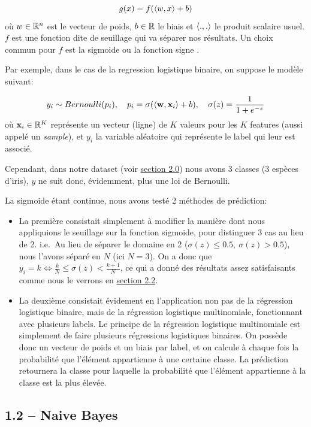 \documentclass[
]{article}
\providecommand{\tightlist}{%
  \setlength{\itemsep}{0pt}\setlength{\parskip}{0pt}}
\begin{document}
\[
g(x) = f(\langle w, x \rangle + b)
\] où \(w \in \mathbb{R}^n\) est le vecteur de poids, \(b \in \mathbb{R}\) le biais et
\(\langle ., . \rangle\) le produit scalaire usuel. \(f\) est une fonction
dite de seuillage qui va séparer nos résultats. Un choix commun pour
\(f\) est la sigmoide ou la fonction signe
\cite{ClassifieurLineaire2022}.

Par exemple, dans le cas de la regression logistique binaire, on suppose
le modèle suivant:

\[
y_i \sim Bernoulli(p_i),\quad p_i = \sigma(\langle \mathbf{w}, \mathbf{x}_i \rangle + b),\quad \sigma(z) = \frac{1}{1 + e^{-z}}
\] où \(\mathbf{x}_i \in \mathbb{R}^K\) représente un vecteur (ligne) de \(K\)
valeurs pour les \(K\) features (aussi appelé un \emph{sample}), et
\(y_i\) la variable aléatoire qui représente le label qui leur est
associé.

Cependant, dans notre dataset (voir
\href{#choix-du-dataset-outils-utilisuxe9s}{section 2.0}) nous avons 3
classes (3 espèces d'iris), \(y\) ne suit donc, évidemment, plus une loi
de Bernoulli.

La sigmoide étant continue, nous avons testé 2 méthodes de prédiction:

\begin{itemize}
\tightlist
\item
  La première consistait simplement à modifier la manière dont nous
  appliquions le seuillage sur la fonction sigmoide, pour distinguer 3
  cas au lieu de 2. i.e.~Au lieu de séparer le domaine en 2
  (\(\sigma(z) \leq 0.5,\ \sigma(z) > 0.5\)), nous l'avons séparé en
  \(N\) (ici \(N = 3\)). On a donc que
  \(y_i = k \Leftrightarrow \frac{k}{N} \leq \sigma(z) < \frac{k + 1}{N}\),
  ce qui a donné des résultats assez satisfaisants comme nous le verrons
  en \href{#ruxe9gression-logistique-1}{section 2.2}.
\item
  La deuxième consistait évidement en l'application non pas de la
  régression logistique binaire, mais de la régression logistique
  multinomiale, fonctionnant avec plusieurs labels. Le principe de la
  régression logistique multinomiale est simplement de faire plusieurs
  régressions logistiques binaires. On possède donc un vecteur de poids
  et un biais par label, et on calcule à chaque fois la probabilité que
  l'élément appartienne à une certaine classe. La prédiction retournera
  la classe pour laquelle la probabilité que l'élément appartienne à la
  classe est la plus élevée.
\end{itemize}

\subsection{1.2 -- Naive Bayes}\label{naive-bayes}
\end{document}
